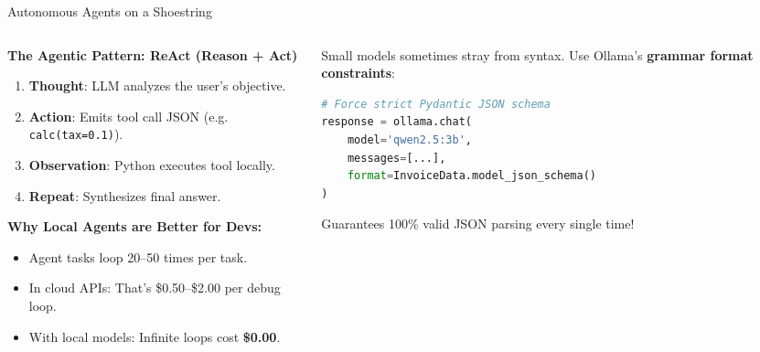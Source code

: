 \documentclass[10pt,aspectratio=169]{beamer}
\begin{document}
\begin{frame}[fragile]{Autonomous Agents on a Shoestring}
    \begin{columns}[T]
        \begin{column}{0.52\textwidth}
            \textbf{The Agentic Pattern: ReAct (Reason + Act)}
            \begin{enumerate}\small
                \item \textbf{Thought}: LLM analyzes the user's objective.
                \item \textbf{Action}: Emits tool call JSON (e.g. \texttt{calc(tax=0.1)}).
                \item \textbf{Observation}: Python executes tool locally.
                \item \textbf{Repeat}: Synthesizes final answer.
            \end{enumerate}
            \vspace{0.1cm}
            \textbf{Why Local Agents are Better for Devs:}
            \begin{itemize}\small
                \item Agent tasks loop 20--50 times per task.
                \item In cloud APIs: That's \$0.50--\$2.00 per debug loop.
                \item With local models: Infinite loops cost \textbf{\$0.00}.
            \end{itemize}
        \end{column}
        \begin{column}{0.45\textwidth}
            \begin{tcolorbox}[colback=ShoeAccent!10, colframe=ShoeAccent, title=\textbf{Structured JSON Output}]
                \small
                Small models sometimes stray from syntax. Use Ollama's \textbf{grammar format constraints}:
                \vspace{0.1cm}
\begin{lstlisting}[language=Python]
# Force strict Pydantic JSON schema
response = ollama.chat(
    model='qwen2.5:3b',
    messages=[...],
    format=InvoiceData.model_json_schema()
)
\end{lstlisting}
                Guarantees 100\% valid JSON parsing every single time!
            \end{tcolorbox}
        \end{column}
    \end{columns}
\end{frame}
\end{document}
